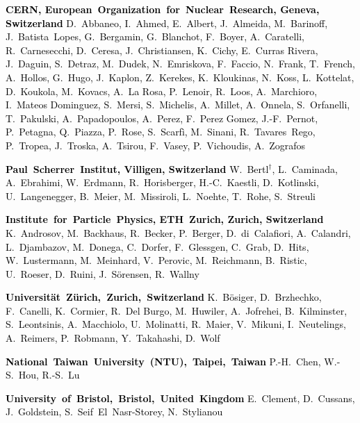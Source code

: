 \textcolor{black}{\textbf{CERN, European~Organization~for~Nuclear~Research, Geneva, Switzerland}\newline
D.~Abbaneo, I.~Ahmed, E.~Albert, J.~Almeida, M.~Barinoff, J.~Batista~Lopes, G.~Bergamin, G.~Blanchot, F.~Boyer, A.~Caratelli, R.~Carnesecchi, D.~Ceresa, J.~Christiansen, K.~Cichy, E.~Curras Rivera, J.~Daguin, S.~Detraz, M.~Dudek, N.~Emriskova, F.~Faccio, N.~Frank, T.~French, A.~Hollos, G.~Hugo, J.~Kaplon, Z.~Kerekes, K.~Kloukinas, N.~Koss, L.~Kottelat, D.~Koukola, M.~Kovacs, A.~La Rosa, P.~Lenoir, R.~Loos, A.~Marchioro, I.~Mateos Dominguez, S.~Mersi, S.~Michelis, A.~Millet, A.~Onnela, S.~Orfanelli, T.~Pakulski, A.~Papadopoulos, A.~Perez, F.~Perez Gomez, J.-F.~Pernot, P.~Petagna, Q.~Piazza, P.~Rose, S.~Scarf\`{i}, M.~Sinani, R.~Tavares~Rego, P.~Tropea, J.~Troska, A.~Tsirou, F.~Vasey, P.~Vichoudis, A.~Zografos}

\textcolor{black}{\textbf{Paul~Scherrer~Institut, Villigen, Switzerland}\newline
W.~Bertl$^{\dag}$, L.~Caminada, A.~Ebrahimi, W.~Erdmann, R.~Horisberger, H.-C.~Kaestli, D.~Kotlinski, U.~Langenegger, B.~Meier, M.~Missiroli, L.~Noehte, T.~Rohe, S.~Streuli}

\textcolor{black}{\textbf{Institute~for~Particle~Physics, ETH~Zurich, Zurich, Switzerland}\newline
K.~Androsov, M.~Backhaus, R.~Becker, P.~Berger, D.~di~Calafiori, A.~Calandri, L.~Djambazov, M.~Donega, C.~Dorfer, F.~Glessgen, C.~Grab, D.~Hits, W.~Lustermann, M.~Meinhard, V.~Perovic, M.~Reichmann, B.~Ristic, U.~Roeser, D.~Ruini, J.~S\"{o}rensen, R.~Wallny}

\textcolor{black}{
\textbf{Universit\"{a}t~Z\"{u}rich,~Zurich,~Switzerland}\newline
K.~B\"{o}siger, D.~Brzhechko, F.~Canelli, K.~Cormier, R.~Del Burgo, M.~Huwiler, A.~Jofrehei, B.~Kilminster, S.~Leontsinis, A.~Macchiolo, U.~Molinatti, R.~Maier, V.~Mikuni, I.~Neutelings, A.~Reimers, P.~Robmann, Y.~Takahashi, D.~Wolf}

\textcolor{black}{\textbf{National~Taiwan~University~(NTU),~Taipei,~Taiwan}\newline
P.-H.~Chen, W.-S.~Hou, R.-S.~Lu}

\textcolor{black}{\textbf{University~of~Bristol,~Bristol,~United~Kingdom}\newline
E.~Clement, D.~Cussans, J.~Goldstein, S.~Seif~El~Nasr-Storey, N.~Stylianou}

